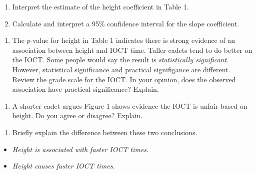 \documentclass[
]{book}
\providecommand{\tightlist}{%
  \setlength{\itemsep}{0pt}\setlength{\parskip}{0pt}}
\begin{document}
\begin{enumerate}
\def\labelenumi{\arabic{enumi}.}
\setcounter{enumi}{4}
\item
  Interpret the estimate of the height coefficient in Table 1.

  \vspace{1in}
\item
  Calculate and interpret a 95\% confidence interval for the slope coefficient.
\end{enumerate}

\vspace{1in}

\newpage

\begin{enumerate}
\def\labelenumi{\arabic{enumi}.}
\setcounter{enumi}{6}
\tightlist
\item
  The \(p\)-value for height in Table 1 indicates there is strong evidence of an association between height and IOCT time. Taller cadets tend to do better on the IOCT. Some people would say the result is \emph{statistically significant}. However, statistical significance and practical signifigance are different. \href{https://en.wikipedia.org/wiki/Indoor_Obstacle_Course_Test}{Review the grade scale for the IOCT.} In your opinion, does the observed association have practical significance? Explain.
\end{enumerate}

\vspace{1in}

\begin{enumerate}
\def\labelenumi{\arabic{enumi}.}
\setcounter{enumi}{7}
\tightlist
\item
  A shorter cadet argues Figure 1 shows evidence the IOCT is unfair based on height. Do you agree or disagree? Explain.
\end{enumerate}

\vspace{1in}

\begin{enumerate}
\def\labelenumi{\arabic{enumi}.}
\setcounter{enumi}{8}
\tightlist
\item
  Briefly explain the difference between these two conclusions.
\end{enumerate}

\begin{itemize}
\item
  \emph{Height is associated with faster IOCT times.}
\item
  \emph{Height causes faster IOCT times.}
\end{itemize}
\end{document}
